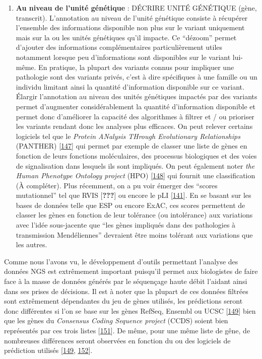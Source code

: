 \documentclass[12pt,twoside]{reedthesis}
\providecommand{\tightlist}{%
  \setlength{\itemsep}{0pt}\setlength{\parskip}{0pt}}
\theoremstyle{definition}
\theoremstyle{definition}
\theoremstyle{remark}
\begin{document}
  \newpage
  
  \begin{enumerate}
  \def\labelenumi{\arabic{enumi}.}
  \setcounter{enumi}{1}
  \tightlist
  \item
    \textbf{Au niveau de l'unité génétique} : DÉCRIRE UNITÉ GÉNÉTIQUE
    (gène, transcrit). L'annotation au niveau de l'unité génétique
    consiste à récupérer l'ensemble des informations disponible non plus
    sur le variant uniquement mais sur la ou les unités génétiques qu'il
    impacte. Ce ``dézoom'' permet d'ajouter des informations
    complémentaires particulièrement utiles notamment lorsque peu
    d'informations sont disponibles sur le variant lui-même. En pratique,
    la plupart des variants connus pour impliquer une pathologie sont des
    variants privés, c'est à dire spécifiques à une famille ou un individu
    limitant ainsi la quantité d'information disponible sur ce variant.
    Élargir l'annotation au niveau des unités génétiques impactés par des
    variants permet d'augmenter considérablement la quantité d'information
    disponible et permet donc d'améliorer la capacité des algorithmes à
    filtrer et / ou prioriser les variants rendant donc les analyses plus
    efficaces. On peut relever certains logiciels tel que le \emph{Protein
    ANalysis THrough Evolutionary Relationships} (PANTHER)
    {[}\protect\hyperlink{ref-Mi2017}{147}{]} qui permet par exemple de
    classer une liste de gènes en fonction de leurs fonctions
    moléculaires, des processus biologiques et des voies de signalisation
    dans lesquels ils sont impliqués. On peut également noter \emph{the
    Human Phenotype Ontology project} (HPO)
    {[}\protect\hyperlink{ref-Kohler2014}{148}{]} qui fournit une
    classification (À compléter). Plus récemment, on a pu voir émerger des
    ``scores mutationnel'' tel que RVIS {[}{\textbf{???}}{]} ou encore le
    pLI {[}\protect\hyperlink{ref-Lek2016}{141}{]}. En se basant sur les
    bases de données telle que ESP ou encore ExAC, ces scores permettent
    de classer les gènes en fonction de leur tolérance (ou intolérance)
    aux variations avec l'idée sous-jacente que ``les gènes impliqués dans
    des pathologies à transmission Mendéliennes'' devraient être moins
    tolérant aux variations que les autres.
  \end{enumerate}
  
  Comme nous l'avons vu, le développement d'outils permettant l'analyse
  des données NGS est extrêmement important puisqu'il permet aux
  biologistes de faire face à la masse de données générés par le
  séquençage haute débit l'aidant ainsi dans ses prises de décisions. Il
  est à noter que la plupart de ces données filtrées sont extrêmement
  dépendantes du jeu de gènes utilisés, les prédictions seront donc
  différentes si l'on se base sur les gènes RefSeq, Ensembl ou UCSC
  {[}\protect\hyperlink{ref-McCarthy2014}{149}{]} bien que les gènes du
  \emph{Consensus Coding Sequence project} (CCDS) soient bien représentés
  par ces trois listes {[}\protect\hyperlink{ref-Pruitt2009}{151}{]}. De
  même, pour une même liste de gêne, de nombreuses différences seront
  observées en fonction du ou des logiciels de prédiction utilisés
  {[}\protect\hyperlink{ref-McCarthy2014}{149},
  \protect\hyperlink{ref-Salgado2016}{152}{]}.
  
\end{document}
